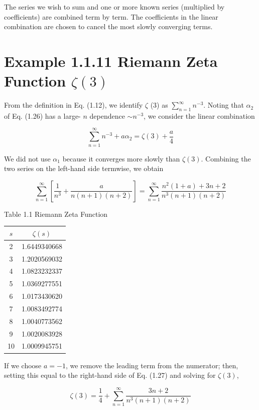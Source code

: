 \documentclass[10pt]{article}
\begin{document}
The series we wish to sum and one or more known series (multiplied by coefficients) are combined term by term. The coefficients in the linear combination are chosen to cancel the most slowly converging terms.

\section*{Example 1.1.11 Riemann Zeta Function $\zeta(3)$}
From the definition in Eq. (1.12), we identify $\zeta$ (3) as $\sum_{n=1}^{\infty} n^{-3}$. Noting that $\alpha_{2}$ of Eq. (1.26) has a large- $n$ dependence $\sim n^{-3}$, we consider the linear combination


\begin{equation*}
\sum_{n=1}^{\infty} n^{-3}+a \alpha_{2}=\zeta(3)+\frac{a}{4} \tag{1.27}
\end{equation*}


We did not use $\alpha_{1}$ because it converges more slowly than $\zeta(3)$. Combining the two series on the left-hand side termwise, we obtain

$$
\sum_{n=1}^{\infty}\left[\frac{1}{n^{3}}+\frac{a}{n(n+1)(n+2)}\right]=\sum_{n=1}^{\infty} \frac{n^{2}(1+a)+3 n+2}{n^{3}(n+1)(n+2)}
$$

Table 1.1 Riemann Zeta Function

\begin{center}
\begin{tabular}{cc}
\hline
$s$ & $\zeta(s)$ \\
\hline
2 & 1.6449340668 \\
3 & 1.2020569032 \\
4 & 1.0823232337 \\
5 & 1.0369277551 \\
6 & 1.0173430620 \\
7 & 1.0083492774 \\
8 & 1.0040773562 \\
9 & 1.0020083928 \\
10 & 1.0009945751 \\
\hline
\end{tabular}
\end{center}

If we choose $a=-1$, we remove the leading term from the numerator; then, setting this equal to the right-hand side of Eq. (1.27) and solving for $\zeta(3)$,


\begin{equation*}
\zeta(3)=\frac{1}{4}+\sum_{n=1}^{\infty} \frac{3 n+2}{n^{3}(n+1)(n+2)} \tag{1.28}
\end{equation*}
\end{document}
